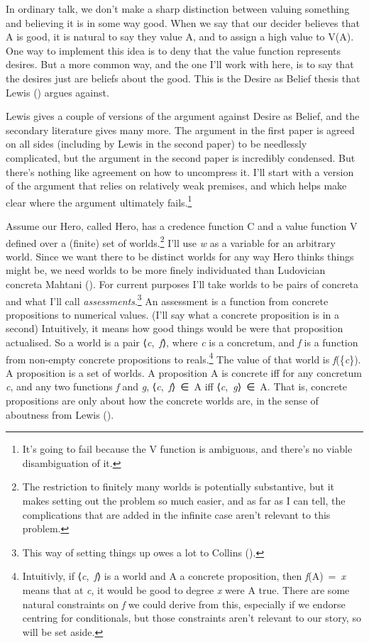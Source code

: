 \documentclass[
  10pt,
  letterpaper,
  DIV=11,
  numbers=noendperiod,
  twoside]{scrartcl}
\begin{document}
In ordinary talk, we don't make a sharp distinction between valuing
something and believing it is in some way good. When we say that our
decider believes that A is good, it is natural to say they value A, and
to assign a high value to V(A). One way to implement this idea is to
deny that the value function represents desires. But a more common way,
and the one I'll work with here, is to say that the desires just are
beliefs about the good. This is the Desire as Belief thesis that Lewis
() argues against.

Lewis gives a couple of versions of the argument against Desire as
Belief, and the secondary literature gives many more. The argument in
the first paper is agreed on all sides (including by Lewis in the second
paper) to be needlessly complicated, but the argument in the second
paper is incredibly condensed. But there's nothing like agreement on how
to uncompress it. I'll start with a version of the argument that relies
on relatively weak premises, and which helps make clear where the
argument ultimately fails.\footnote{It's going to fail because the V
  function is ambiguous, and there's no viable disambiguation of it.}

Assume our Hero, called Hero, has a credence function C and a value
function V defined over a (finite) set of worlds.\footnote{The
  restriction to finitely many worlds is potentially substantive, but it
  makes setting out the problem so much easier, and as far as I can
  tell, the complications that are added in the infinite case aren't
  relevant to this problem.} I'll use \emph{w} as a variable for an
arbitrary world. Since we want there to be distinct worlds for any way
Hero thinks things might be, we need worlds to be more finely
individuated than Ludovician concreta Mahtani
(). For current purposes I'll take
worlds to be pairs of concreta and what I'll call
\emph{assessments}.\footnote{This way of setting things up owes a lot to
  Collins ().} An assessment is a
function from concrete propositions to numerical values. (I'll say what
a concrete proposition is in a second) Intuitively, it means how good
things would be were that proposition actualised. So a world is a pair
⟨\emph{c},~\emph{f}⟩, where \emph{c} is a concretum, and \emph{f} is a
function from non-empty concrete propositions to reals.\footnote{Intuitivly,
  if ⟨\emph{c},~\emph{f}⟩ is a world and A a concrete proposition, then
  \emph{f}(A)~=~\emph{x} means that at \emph{c}, it would be good to
  degree \emph{x} were A true. There are some natural constraints on
  \emph{f} we could derive from this, especially if we endorse centring
  for conditionals, but those constraints aren't relevant to our story,
  so will be set aside.} The value of that world is
\emph{f}(\{\emph{c}\}). A proposition is a set of worlds. A proposition
A is concrete iff for any concretum \emph{c}, and any two functions
\emph{f} and \emph{g}, ⟨\emph{c},~\emph{f}⟩~∈~A iff
⟨\emph{c},~\emph{g}⟩~∈~A. That is, concrete propositions are only about
how the concrete worlds are, in the sense of aboutness from Lewis
().
\end{document}

